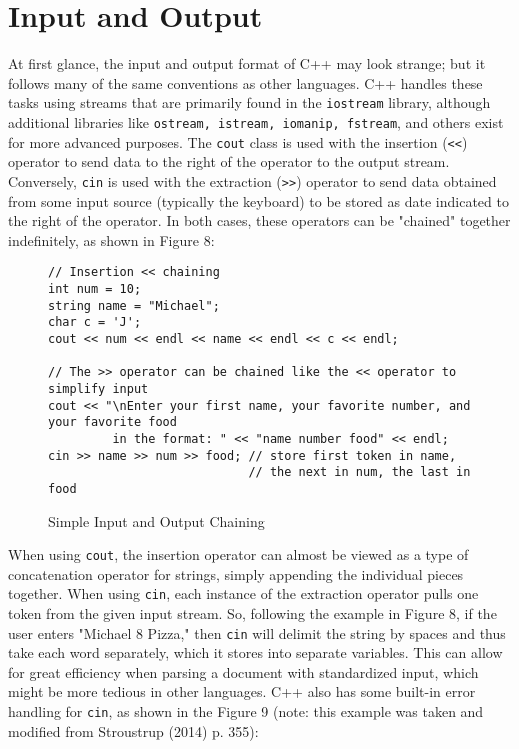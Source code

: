 \documentclass[11pt]{article}
\begin{document}
\section{Input and Output}

	At first glance, the input and output format of C++ may look strange; but it follows many of the same conventions as other languages.  C++ handles these tasks using streams that are primarily found in the \texttt{iostream} library, although additional libraries like \texttt{ostream, istream, iomanip, fstream}, and others exist for more advanced purposes.  The \texttt{cout} class is used with the insertion (\texttt{<<}) operator to send data to the right of the operator to the output stream.  Conversely, \texttt{cin} is used with the extraction (\texttt{>>}) operator to send data obtained from some input source (typically the keyboard) to be stored as date indicated to the right of the operator.  In both cases, these operators can be "chained" together indefinitely, as shown in Figure 8:
	
\begin{figure}[!h]
\centering
\begin{BVerbatim}
// Insertion << chaining
int num = 10;
string name = "Michael";
char c = 'J';
cout << num << endl << name << endl << c << endl;

// The >> operator can be chained like the << operator to simplify input
cout << "\nEnter your first name, your favorite number, and your favorite food 
         in the format: " << "name number food" << endl;
cin >> name >> num >> food; // store first token in name, 
                            // the next in num, the last in food
\end{BVerbatim}
\caption{Simple Input and Output Chaining}
\end{figure} \FloatBarrier

When using \texttt{cout}, the insertion operator can almost be viewed as a type of concatenation operator for strings, simply appending the individual pieces together.  When using \texttt{cin}, each instance of the extraction operator pulls one token from the given input stream.  So, following the example in Figure 8, if the user enters "Michael 8 Pizza," then \texttt{cin} will delimit the string by spaces and thus take each word separately, which it stores into separate variables.  This can allow for great efficiency when parsing a document with standardized input, which might be more tedious in other languages.  C++ also has some built-in error handling for \texttt{cin}, as shown in the Figure 9 (note: this example was taken and modified from Stroustrup (2014) p. 355):
\end{document}
